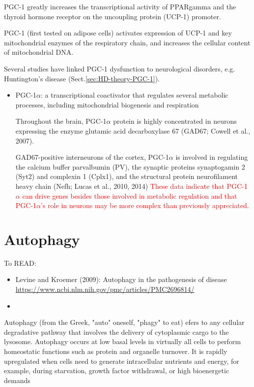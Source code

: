 PGC-1 greatly increases the transcriptional activity of PPARgamma and the
thyroid hormone receptor on the uncoupling protein (UCP-1) promoter.

PGC-1 (first tested on adipose cells) activates expression of UCP-1 and key
mitochondrial enzymes of the respiratory chain, and increases the cellular
content of mitochondrial DNA.

Several studies have linked PGC-1 dysfunction to neurological disorders, e.g.
Huntington's disease (Sect.\ref{sec:HD-theory-PGC-1}).
\begin{itemize}
  \item  PGC-1$\alpha$: a transcriptional coactivator that regulates several
  metabolic processes, including mitochondrial biogenesis and respiration

Throughout the brain, PGC-1$\alpha$ protein is highly concentrated in neurons
expressing the enzyme glutamic acid decarboxylase 67 (GAD67; Cowell et al.,
2007).

GAD67-positive interneurons of the cortex, PGC-1$\alpha$ is involved in
regulating the calcium buffer parvalbumin (PV), the synaptic proteins
synaptogamin 2 (Syt2) and complexin 1 (Cplx1), and the structural protein
neurofilament heavy chain (Nefh; Lucas et al., 2010, 2014)
\textcolor{red}{These data indicate that PGC-1$\alpha$ can drive genes besides
those involved in metabolic regulation and that PGC-1$\alpha$'s role in neurons
may be more complex than previously appreciated.}

\end{itemize}




\section{Autophagy}
\label{sec:autophagy}

To READ:
\begin{itemize}
  \item Levine and Kroemer (2009): Autophagy in the pathogenesis of disease
\url{https://www.ncbi.nlm.nih.gov/pmc/articles/PMC2696814/}
  \item
\end{itemize}

Autophagy (from the Greek, "auto" oneself, "phagy" to eat) efers to any cellular
degradative pathway that involves the delivery of cytoplasmic cargo to the
lysosome. Autophagy occurs at low basal levels in virtually all cells to perform
homeostatic functions such as protein and organelle turnover.
 It is rapidly upregulated when cells need to generate intracellular nutrients
and energy, for example, during starvation, growth factor withdrawal, or high
bioenergetic demands

